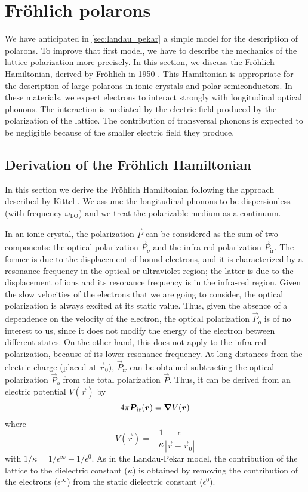 \section{Fröhlich polarons}
We have anticipated in \cref{sec:landau_pekar} a simple model for the description of polarons. To improve that first model, we have to describe the mechanics of the lattice polarization more precisely. In this section, we discuss the Fröhlich Hamiltonian, derived by Fröhlich in 1950 \cite{frohlich1950}. This Hamiltonian is appropriate for the description of large polarons in ionic crystals and polar semiconductors. In these materials, we expect electrons to interact strongly with longitudinal optical phonons. The interaction is mediated by the electric field produced by the polarization of the lattice. The contribution of transversal phonons is expected to be negligible because of the smaller electric field they produce.

\subsection{Derivation of the Fröhlich Hamiltonian}
In this section we derive the Fröhlich Hamiltonian following the approach described by Kittel \cite{kittel1987}. We assume the longitudinal phonons to be dispersionless (with frequency $\omega_\text{LO}$) and we treat the polarizable medium as a continuum.

In an ionic crystal, the polarization $\vec{P}$ can be considered as the sum of two components: the optical polarization $\vec{P}_o$ and the infra-red polarization $\vec{P}_\text{ir}$. The former is due to the displacement of bound electrons, and it is characterized by a resonance frequency in the optical or ultraviolet region; the latter is due to the displacement of ions and its resonance frequency is in the infra-red region. Given the slow velocities of the electrons that we are going to consider, the optical polarization is always excited at its static value. Thus, given the absence of a dependence on the velocity of the electron, the optical polarization $\vec{P}_o$ is of no interest to us, since it does not modify the energy of the electron between different states. On the other hand, this does not apply to the infra-red polarization, because of its lower resonance frequency. At long distances from the electric charge (placed at $\vec{r}_0)$, $\vec{P}_\text{ir}$ can be obtained subtracting the optical polarization $\vec{P}_o$ from the total polarization $\vec{P}$. Thus, it can be derived from an electric potential $V(\vec{r})$ by
\begin{equation} \label{eq:polarization_potential}
    4\pi\mathbf{\boldsymbol{P}}_\text{ir}(\mathbf{\boldsymbol{r}}) = \grad V(\mathbf{\boldsymbol{r}})
\end{equation}
where
\begin{equation}
    V(\vec{r}) = -\frac{1}{\kappa} \frac{e}{|\vec{r}-\vec{r}_0|}
\end{equation}
with $1/\kappa = 1 / \epsilon^\infty - 1/\epsilon^0$. As in the Landau-Pekar model, the contribution of the lattice to the dielectric constant ($\kappa$) is obtained by removing the contribution of the electrons ($\epsilon^\infty$) from the static dielectric constant ($\epsilon^0$).


